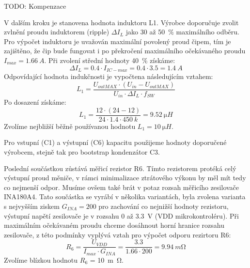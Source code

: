     TODO: Kompenzace

    V dalším kroku je stanovena hodnota induktoru L1. Výrobce doporučuje zvolit zvlnění proudu induktorem (ripple) \(\Delta I_{L}  \) jako 30 až \qty{50}{\percent} maximálního odběru. Pro výpočet induktoru je uvažován maximální povolený proud čipem, tím je zajištěno, že čip bude fungovat i po překročení maximálního očekávaného proudu \(I_{max} = \qty{1.66}{A} \). Při zvolení střední hodnoty \qty{40}{\percent} získáme:
    \begin{equation}
        \Delta I_{L} = \num{0.4}\cdot I_{IC-max} = \num{0.4} \cdot  \num{3.5} = \qty{1.4}{A}
    \end{equation}
    Odpovídající hodnota indukčnosti je vypočtena následujícím vztahem:
    \begin{equation}
        L_{1} = \frac{U_{outMAX}\cdot (U_{in} -U_{outMAX} ) }{U_{in} \cdot \Delta I_{L}\cdot f_{SW}  }
    \end{equation}
    Po dosazení získáme:
    \begin{equation}
        L_{1} = \frac{12\cdot (24 -12 ) }{24 \cdot \num{1.4}\cdot \qty{450}{k}  } = \qty{9.52}{\micro H}
    \end{equation}
    Zvolíme nejbližší běžně používanou hodnotu \(L_{1} = \qty{10}{\micro H}\). 

    Pro vstupní (C1) a výstupní (C6) kapacitu použijeme hodnoty doporučené výrobcem, stejně tak pro bootstrap kondenzátor C3. 
    
    Poslední součástkou zůstává měřicí rezistor R6. Tímto rezistorem protéká celý výstupní proud měniče, v rámci minimalizace ztrátového výkonu by měl mít tedy co nejmenší odpor. Musíme ovšem také brát v potaz rozsah měřicího zesilovače INA180A4. Tato součástka se vyrábí v několika variantách, byla zvolena varianta s nejvyšším ziskem \(G_{INA}=200 \) pro zachování co nejnižší hodnoty rezistoru, výstupní napětí zesilovače je v rozsahu 0 až \qty{3.3}{V} (VDD mikrokontroléru).
    Při maximálním očekávaném proudu chceme dosáhnout horní hranice rozsahu zesilovače, z této podmínky vyplývá vztah pro výpočet odporu rezirtoru R6:
    \begin{equation}
        R_{6} = \frac{U_{VDD}}{I_{max} \cdot G_{INA} } = \frac{\num{3.3}}{\num{1.66}\cdot 200} = \qty{9.94}{m\ohm}
    \end{equation} 
    Zvolíme blízkou hodnotu \(R_{6} \) = \qty{10}{m\ohm}.


